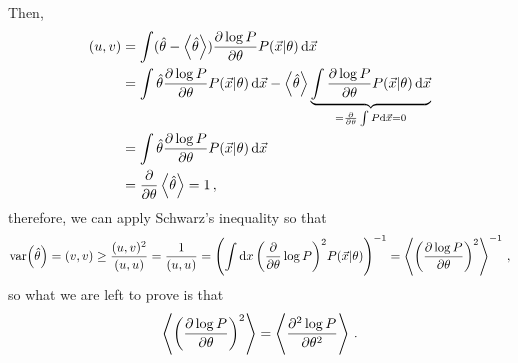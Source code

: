 \documentclass[main.tex]{subfiles}
\begin{document}
Then, 
%
\begin{align}
(u, v) &= \int (\hat{\theta} - \expval{\hat{\theta}}) \pdv{\log P}{\theta } P(\vec{x} | \theta ) \dd{\vec{x}} \\
&= \int \hat{\theta} \pdv{\log P}{\theta } P(\vec{x} | \theta ) \dd{\vec{x}} - 
\expval{\hat{\theta}} \underbrace{\int \pdv{\log P}{\theta } P(\vec{x} | \theta ) \dd{\vec{x}}}_{= \pdv{}{\theta } \int P \dd{\vec{x}} = 0}  \\
&= \int \hat{\theta} \pdv{\log P}{\theta } P(\vec{x} | \theta ) \dd{\vec{x}}  \\
&= \pdv{}{\theta } \expval{\hat{\theta}} = 1
\,,
\end{align}
%
therefore, we can apply Schwarz's inequality so that 
%
\begin{align}
\text{var} \qty(\hat{\theta}) = (v, v) \geq \frac{(u, v)^2}{(u, u)} = \frac{1}{(u, u)}
= \qty(\int \dd{x} \qty(\pdv{}{\theta } \log P)^2 P(\vec{x} | \theta ))^{-1} = \expval{\qty(\pdv{\log P}{\theta })^2}^{-1}
\,,
\end{align}
%
so what we are left to prove is that 
%
\begin{align}
\expval{\qty(\pdv{\log P}{\theta })^2} = \expval{\pdv[2]{\log P}{\theta }}
\,.
\end{align}
\end{document}
